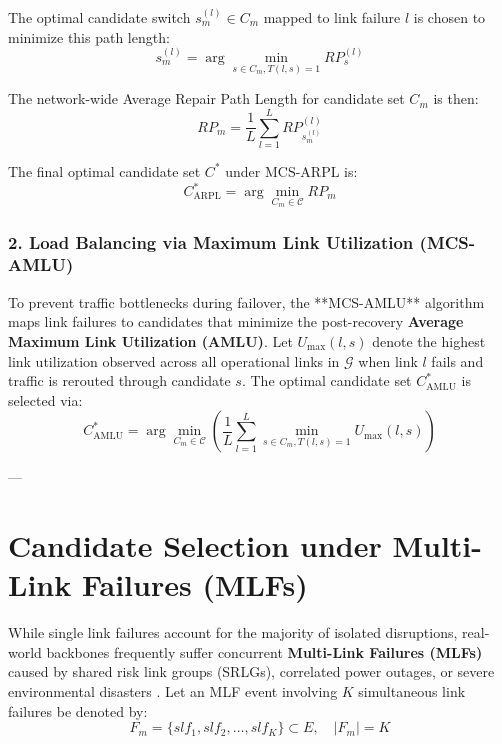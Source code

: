 The optimal candidate switch $s_m^{(l)} \in C_m$ mapped to link failure $l$ is chosen to minimize this path length:
\begin{equation}
    s_m^{(l)} = \arg\min_{s \in C_m, T(l, s) = 1} RP_s^{(l)}
\end{equation}

The network-wide Average Repair Path Length for candidate set $C_m$ is then:
\begin{equation}
    RP_m = \frac{1}{L} \sum_{l=1}^L RP_{s_m^{(l)}}^{(l)}
\end{equation}

The final optimal candidate set $C^*$ under MCS-ARPL is:
\begin{equation}
    C^*_{\text{ARPL}} = \arg\min_{C_m \in \mathcal{C}} RP_m
\end{equation}

\subsubsection{2. Load Balancing via Maximum Link Utilization (MCS-AMLU)}
To prevent traffic bottlenecks during failover, the **MCS-AMLU** algorithm maps link failures to candidates that minimize the post-recovery \textbf{Average Maximum Link Utilization (AMLU)}. Let $U_{\max}(l, s)$ denote the highest link utilization observed across all operational links in $\mathcal{G}$ when link $l$ fails and traffic is rerouted through candidate $s$. The optimal candidate set $C^*_{\text{AMLU}}$ is selected via:
\begin{equation}
    C^*_{\text{AMLU}} = \arg\min_{C_m \in \mathcal{C}} \left( \frac{1}{L} \sum_{l=1}^L \min_{s \in C_m, T(l, s)=1} U_{\max}(l, s) \right)
\end{equation}

---

\section{Candidate Selection under Multi-Link Failures (MLFs)}
\label{sec:sdn_mlf}

While single link failures account for the majority of isolated disruptions, real-world backbones frequently suffer concurrent \textbf{Multi-Link Failures (MLFs)} caused by shared risk link groups (SRLGs), correlated power outages, or severe environmental disasters \cite{vuppalapati2025candidate}. Let an MLF event involving $K$ simultaneous link failures be denoted by:
\begin{equation}
    F_m = \{slf_1, slf_2, \dots, slf_K\} \subset E, \quad |F_m| = K
\end{equation}

